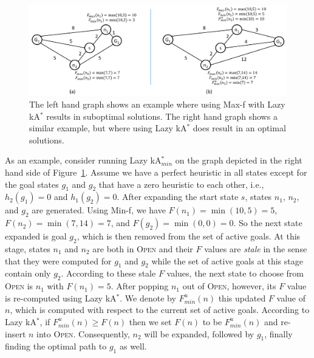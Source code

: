 \documentclass{aicom2e}
\newcommand{\kastar}{kA$^*$}
\newcommand{\kastarmin}{kA$^*_{min}$}
\newcommand{\minf}{Min-f}
\newcommand{\maxf}{Max-f}
\newcommand{\open}{\textsc{Open}}
\begin{document}
\begin{figure}
	\includegraphics[width=\textwidth]{Lazy_cropped.pdf}      
	\caption{The left hand graph shows an example where using \maxf{} with Lazy \kastar{} results in suboptimal solutions. The right hand graph shows a similar example, but where using Lazy \kastar{} does result in an optimal solutions.}
	\label{fig:lazy}
\end{figure}

As an example, consider running Lazy \kastarmin{} on the graph depicted in the right hand side of Figure~\ref{fig:lazy}. Assume we have a perfect heuristic in all states except for the goal states $g_1$ and $g_2$ that have a zero heuristic to each other, i.e., $h_2(g_1)=0$ and $h_1(g_2)=0$. After expanding the start state $s$, states $n_1$, $n_2$, and $g_2$ are generated. Using \minf{}, we have $F(n_1)=\min(10,5)=5$, $F(n_2)=\min(7,14)=7$, and $F(g_2)=\min(0,0)=0$. So the next state expanded is goal $g_2$, which is then removed from the set of active goals. At this stage, states $n_1$ and $n_2$ are both in \open{} and their $F$ values are {\em stale} in the sense that they were computed for $g_1$ and $g_2$ while the set of active goals at this stage contain only $g_2$. According to these stale $F$ values, the next state to choose from \open{} is $n_1$ with $F(n_1)=5$. After popping $n_1$ out of \open{}, however, its $F$ value is re-computed  using Lazy \kastar{}. We denote by $F^u_{min}(n)$ this updated $F$ value of $n$, which is computed with respect to the current set of active goals. According to Lazy \kastar{}, if $F^u_{min}(n)\geq F(n)$ then we set $F(n)$ to be $F^u_{min}(n)$ and re-insert $n$ into \open{}. Consequently, $n_2$ will be expanded, followed by $g_1$, finally finding the optimal path to $g_1$ as well. 


\end{document}
